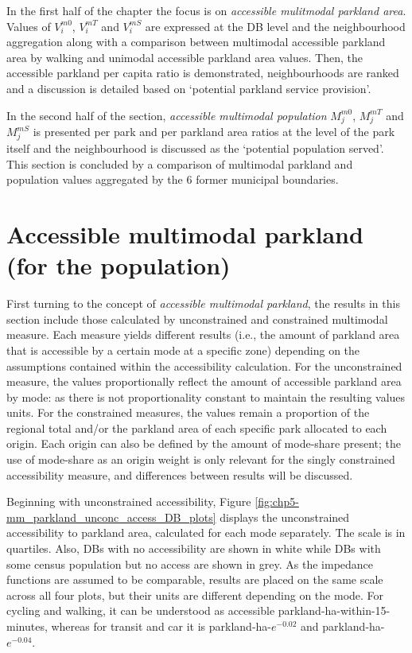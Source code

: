 \documentclass[
11pt, %
oneside, %
english, %
singlespacing, %
]{macthesis} %
\begin{document}
In the first half of the chapter the focus is on \emph{accessible mulitmodal parkland area}. Values of \(V^{m0}_i\), \(V^{mT}_i\) and \(V^{mS}_i\) are expressed at the DB level and the neighbourhood aggregation along with a comparison between multimodal accessible parkland area by walking and unimodal accessible parkland area values. Then, the accessible parkland per capita ratio is demonstrated, neighbourhoods are ranked and a discussion is detailed based on `potential parkland service provision'.

In the second half of the section, \emph{accessible multimodal population} \(M^{m0}_j\), \(M^{mT}_j\) and \(M^{mS}_j\) is presented per park and per parkland area ratios at the level of the park itself and the neighbourhood is discussed as the `potential population served'. This section is concluded by a comparison of multimodal parkland and population values aggregated by the 6 former municipal boundaries.

\section{Accessible multimodal parkland (for the population)}\label{accessible-multimodal-parkland-for-the-population}

First turning to the concept of \emph{accessible multimodal parkland}, the results in this section include those calculated by unconstrained and constrained multimodal measure. Each measure yields different results (i.e., the amount of parkland area that is accessible by a certain mode at a specific zone) depending on the assumptions contained within the accessibility calculation. For the unconstrained measure, the values proportionally reflect the amount of accessible parkland area by mode: as there is not proportionality constant to maintain the resulting values units. For the constrained measures, the values remain a proportion of the regional total and/or the parkland area of each specific park allocated to each origin. Each origin can also be defined by the amount of mode-share present; the use of mode-share as an origin weight is only relevant for the singly constrained accessibility measure, and differences between results will be discussed.

Beginning with unconstrained accessibility, Figure \ref{fig:chp5-mm_parkland_unconc_access_DB_plots} displays the unconstrained accessibility to parkland area, calculated for each mode separately. The scale is in quartiles. Also, DBs with no accessibility are shown in white while DBs with some census population but no access are shown in grey. As the impedance functions are assumed to be comparable, results are placed on the same scale across all four plots, but their units are different depending on the mode. For cycling and walking, it can be understood as accessible parkland-ha-within-15-minutes, whereas for transit and car it is parkland-ha-\(e^{-0.02}\) and parkland-ha-\(e^{-0.04}\).
\end{document}
